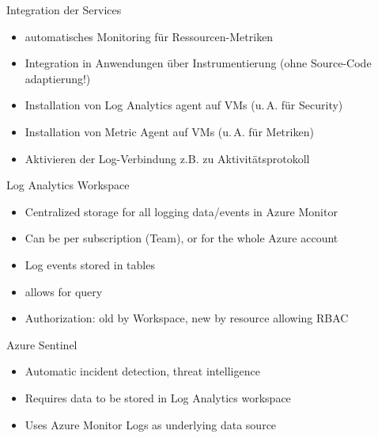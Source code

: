 \begin{flashcard}[Definition]{Integration der Services}
  \begin{itemize}
    \item automatisches Monitoring für Ressourcen-Metriken
    \item Integration in Anwendungen über Instrumentierung\newline
      (ohne Source-Code adaptierung!)
    \item Installation von Log Analytics agent auf VMs (u.\,A. für Security)
    \item Installation von Metric Agent auf VMs (u.\,A. für Metriken)
    \item Aktivieren der Log-Verbindung z.B. zu Aktivitätsprotokoll
  \end{itemize}
\end{flashcard}

\begin{flashcard}[Definition]{Log Analytics Workspace}
  \begin{itemize}
    \item Centralized storage for all logging data/events in Azure Monitor
    \item Can be per subscription (Team), or for the whole Azure account
    \item Log events stored in tables
    \item allows for query
    \item Authorization: old by Workspace, new by resource allowing RBAC
  \end{itemize}
\end{flashcard}

\begin{flashcard}[Definition]{Azure Sentinel}
  \begin{itemize}
    \item Automatic incident detection, threat intelligence
    \item Requires data to be stored in Log Analytics workspace
    \item Uses Azure Monitor Logs as underlying data source
  \end{itemize}
\end{flashcard}


